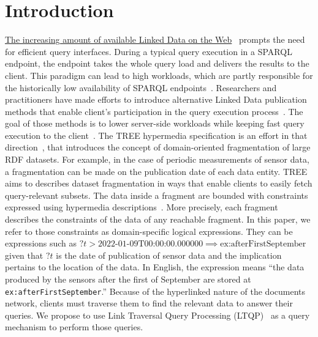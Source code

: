 \section{Introduction}



\href{https://lod-cloud.net/#diagram}{The increasing amount of available Linked Data on the Web}~\cite{Ermilov2013} prompts the need for efficient query interfaces.
During a typical query execution in a SPARQL endpoint, the endpoint takes the whole query load and delivers the results to the client.
This paradigm can lead to high workloads, which are partly responsible for the historically low availability of SPARQL endpoints~\cite{aranda2013}.
Researchers and practitioners have made efforts to introduce alternative Linked Data publication methods that enable client's participation in the query execution process~\cite{Verborgh2016TriplePF}.
The goal of those methods is to lower server-side workloads while keeping fast query execution to the client~\cite{Azzam2021}.
The TREE hypermedia specification is an effort in that direction~\cite{ColpaertMaterializedTREE, lancker2021LDS}, that introduces the concept of domain-oriented fragmentation of large RDF datasets.
For example, in the case of periodic measurements of sensor data, a fragmentation can be made on the publication date of each data entity.
TREE aims to describes dataset fragmentation in ways that enable clients to easily fetch query-relevant subsets.
The data inside a fragment are bounded with constraints expressed using hypermedia descriptions~\cite{thomasFieldingPhdThesis}.
More precisely, each fragment describes the constraints of the data of any reachable fragment.
In this paper, we refer to those constraints as domain-specific logical expressions.
They can be expressions such as $?t > \text{2022-01-09T00:00:00.000000} \implies \text{ex:afterFirstSeptember}$ given that $?t$ is the date of publication of sensor data and the implication pertains to the location of the data.
In English, the expression means ``the data produced by the sensors after the first of September are stored at \texttt{ex:afterFirstSeptember}.''
Because of the hyperlinked nature of the documents network, clients must traverse them to find the relevant data to answer their queries.
We propose to use Link Traversal Query Processing (LTQP)~\cite{Hartig2016} as a query mechanism to perform those queries.

